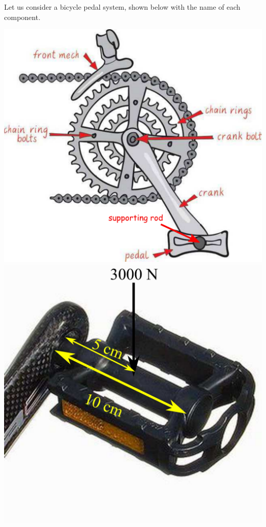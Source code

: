 \documentclass[
10pt,
a4paper,
openany,
svgnames,
]{book}
\newcommand{\exercise}{%
\item \label{lab:\arabic{chapter}-\arabic{exercisesi}}  %
}
\begin{document}
\begin{exercises}
  \exercise Let us consider a bicycle pedal system, shown below with the name of each component.
  \begin{center}
    \includegraphics[scale=0.44]{pictures/Machine-interaction/pedal-system}
    \includegraphics[scale=0.3]{pictures/Machine-interaction/pedal}
  \end{center}
  

\end{exercises}
\end{document}
